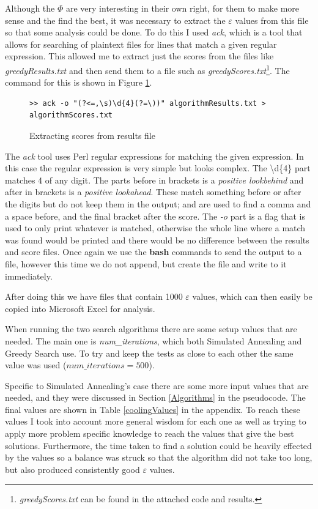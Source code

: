 \documentclass[12pt]{report}
\begin{document}
Although the $\Phi$ are very interesting in their own right, for them to make more sense and the find the best, it was necessary to extract the $\varepsilon$ values from this file so that some analysis could be done. To do this I used \textit{ack}\cite{ack}, which is a tool that allows for searching of plaintext files for lines that match a given regular expression. This allowed me to extract just the scores from the files like \textit{greedyResults.txt} and then send them to a file such as \textit{greedyScores.txt}\footnote{\textit{greedyScores.txt} can be found in the attached code and results.}. The command for this is shown in Figure \ref{ackCommand}.

\begin{figure}[H]
\caption{Extracting scores from results file}
\label{ackCommand}
\begin{verbatim}
>> ack -o "(?<=,\s)\d{4}(?=\))" algorithmResults.txt > algorithmScores.txt
\end{verbatim}
\end{figure}

The \textit{ack} tool uses Perl regular expressions for matching the given expression. In this case the regular expression is very simple but looks complex. The \textbackslash d\{4\} part matches 4 of any digit. The parts before in brackets is a \textit{positive lookbehind} and after in brackets is a \textit{positive lookahead}. These match something before or after the digits but do not keep them in the output; and are used to find a comma and a space before, and the final bracket after the score. The \textit{-o} part is a flag that is used to only print whatever is matched, otherwise the whole line where a match was found would be printed and there would be no difference between the results and score files. Once again we use the \textbf{bash} commands to send the output to a file, however this time we do not append, but create the file and write to it immediately.

After doing this we have files that contain 1000 $\varepsilon$ values, which can then easily be copied into Microsoft Excel for analysis.

When running the two search algorithms there are some setup values that are needed. The main one is \textit{num\_iterations}, which both Simulated Annealing and Greedy Search use. To try and keep the tests as close to each other the same value was used ($num\_iterations = 500$).

Specific to Simulated Annealing's case there are some more input values that are needed, and they were discussed in Section \ref{Algorithms} in the pseudocode. The final values are shown in Table \ref{coolingValues} in the appendix. To reach these values I took into account more general wisdom for each one as well as trying to apply more problem specific knowledge to reach the values that give the best solutions. Furthermore, the time taken to find a solution could be heavily effected by the values so a balance was struck so that the algorithm did not take too long, but also produced consistently good $\varepsilon$ values.
\end{document}
